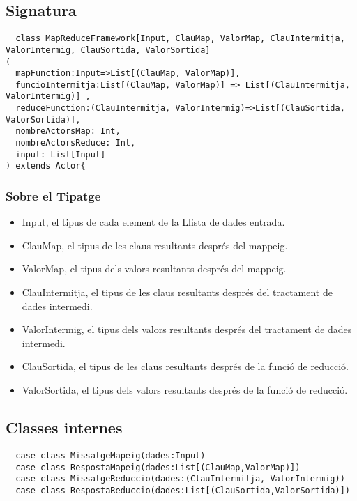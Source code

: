 \documentclass[11pt,a4paper,twoside]{report}
\begin{document}
\subsection{Signatura}

\begin{lstlisting}
  class MapReduceFramework[Input, ClauMap, ValorMap, ClauIntermitja, ValorIntermig, ClauSortida, ValorSortida]
(
  mapFunction:Input=>List[(ClauMap, ValorMap)],
  funcioIntermitja:List[(ClauMap, ValorMap)] => List[(ClauIntermitja, ValorIntermig)] ,
  reduceFunction:(ClauIntermitja, ValorIntermig)=>List[(ClauSortida, ValorSortida)],
  nombreActorsMap: Int,
  nombreActorsReduce: Int,
  input: List[Input]
) extends Actor{
\end{lstlisting}

\subsubsection{Sobre el Tipatge}

\begin{itemize}
  \item Input, el tipus de cada element de la Llista de dades entrada.
  \item ClauMap, el tipus de les claus resultants després del mappeig.
  \item ValorMap, el tipus dels valors resultants després del mappeig.
  \item ClauIntermitja, el tipus de les claus resultants després del tractament de dades intermedi.
  \item ValorIntermig, el tipus dels valors resultants després del tractament de dades intermedi.
  \item ClauSortida, el tipus de les claus resultants després de la funció de reducció.
  \item ValorSortida, el tipus dels valors resultants després de la funció de reducció.
\end{itemize}

\subsection{Classes internes}

\begin{lstlisting}
  case class MissatgeMapeig(dades:Input)
  case class RespostaMapeig(dades:List[(ClauMap,ValorMap)])
  case class MissatgeReduccio(dades:(ClauIntermitja, ValorIntermig))
  case class RespostaReduccio(dades:List[(ClauSortida,ValorSortida)])
\end{lstlisting}
\end{document}
